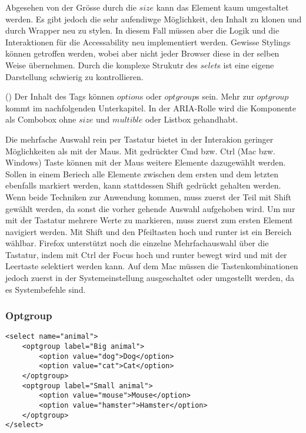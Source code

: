 Abgesehen von der Grösse durch die $size$ kann das Element kaum umgestaltet werden.
Es gibt jedoch die sehr aufendiwge Möglichkeit, den Inhalt zu klonen und durch Wrapper neu zu stylen.
In diesem Fall müssen aber die Logik und die Interaktionen für die Accessability neu implementiert werden.
Gewisse Stylings können getroffen werden, wobei aber nicht jeder Browser diese in der selben Weise übernehmen.
Durch die komplexe Strukutr des $selet$s ist eine eigene Darstellung schwierig zu kontrollieren.

(\cite{selectMdn}) Der Inhalt des Tags können $option$s oder $optgroup$s sein.
Mehr zur $optgroup$ kommt im nachfolgenden Unterkapitel.
In der ARIA-Rolle wird die Komponente als Combobox ohne $size$ und $multible$ oder Listbox gehandhabt.

Die mehrfache Auswahl rein per Tastatur bietet in der Interakion geringer Möglichkeiten als mit der Maus.
Mit gedrückter Cmd bzw. Ctrl (Mac bzw. Windows) Taste können mit der Maus weitere Elemente dazugewählt werden.
Sollen in einem Beriech alle Elemente zwischen dem ersten und dem letzten ebenfalls markiert werden, kann stattdessen Shift gedrückt gehalten werden.
Wenn beide Techniken zur Anwendung kommen, muss zuerst der Teil mit Shift gewählt werden, da sonst die vorher gehende Auswahl aufgehoben wird.
Um nur mit der Tastatur mehrere Werte zu markieren, muss zuerst zum ersten Element navigiert werden.
Mit Shift und den Pfeiltasten hoch und runter ist ein Bereich wählbar.
Firefox unterstützt noch die einzelne Mehrfachauswahl über die Tastatur, indem mit Ctrl der Focus hoch und runter bewegt wird und mit der Leertaste selektiert werden kann.
Auf dem Mac müssen die Tastenkombinationen jedoch zuerst in der Systemeinstellung ausgeschaltet oder umgestellt werden, da es Systembefehle sind.


\subsubsection{Optgroup}

\begin{lstlisting}[language = html5, caption = Optgroup Example, label = code:OptgroupExample]
<select name="animal">
    <optgroup label="Big animal">
        <option value="dog">Dog</option>
        <option value="cat">Cat</option>
    </optgroup>
    <optgroup label="Small animal">
        <option value="mouse">Mouse</option>
        <option value="hamster">Hamster</option>
    </optgroup>
</select>
\end{lstlisting}

